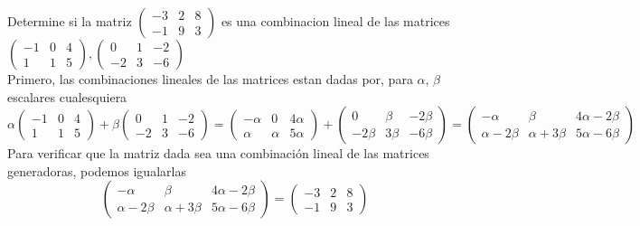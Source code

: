\item Determine si la matriz 
    \(
        \left(\begin{smallmatrix}
            -3 & 2 & 8 \\
            -1 & 9 & 3
        \end{smallmatrix}\right)
    \)
    es una combinacion lineal de las matrices
    \(
        \left(\begin{smallmatrix}
            -1 & 0 & 4 \\
            1 & 1 & 5
        \end{smallmatrix}\right),
        \left(\begin{smallmatrix}
            0 & 1 & -2 \\
            -2 & 3 & -6
        \end{smallmatrix}\right)
    \) \\
    Primero, las combinaciones lineales de las matrices estan dadas por, para \(\alpha\), \(\beta\) escalares cualesquiera
    \[
        \alpha
        \begin{pmatrix}
            -1 & 0 & 4 \\
            1 & 1 & 5
        \end{pmatrix}
        +
        \beta
        \begin{pmatrix}
            0 & 1 & -2 \\
            -2 & 3 & -6
        \end{pmatrix}
        =
        \begin{pmatrix}
            -\alpha & 0 & 4\alpha \\
            \alpha & \alpha & 5\alpha
        \end{pmatrix}
        +
        \begin{pmatrix}
            0 & \beta & -2\beta \\
            -2\beta & 3\beta & -6\beta
        \end{pmatrix}
        =
        \begin{pmatrix}
            -\alpha & \beta & 4\alpha - 2\beta \\
            \alpha -2\beta & \alpha + 3\beta & 5\alpha - 6\beta
        \end{pmatrix}
    \]
    Para verificar que la matriz dada sea una combinación lineal de las matrices generadoras, podemos igualarlas
    \[
        \begin{pmatrix}
            -\alpha & \beta & 4\alpha - 2\beta \\
            \alpha -2\beta & \alpha + 3\beta & 5\alpha - 6\beta
        \end{pmatrix}
        =
        \begin{pmatrix}
            -3 & 2 & 8 \\
            -1 & 9 & 3
        \end{pmatrix}
    \]
